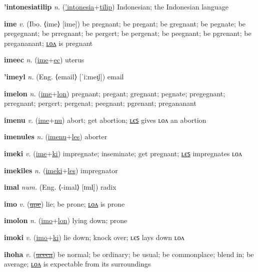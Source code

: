 \textbf{\hypertarget{'intonesiatilip}{'intonesiatilip}} \textit{n.} (\hyperlink{'intonesia}{'intonesia}+\allowbreak \hyperlink{tilip}{tilip})
Indonesian; the Indonesian language

\textbf{\hypertarget{ime}{ime}} \textit{v.} (Ibo. ⟨ime⟩ [ime])
be pregnant; be pregant; be gregnant; be pegnate; be pregegnant; be prregnant; be pergert; be pergenat; be peegnant; be pgrenant; be pregananant; \hyperlink{imelon}{ʟᴏᴧ} is pregnant

\textbf{\hypertarget{imeec}{imeec}} \textit{n.} (\hyperlink{ime}{ime}+\allowbreak \hyperlink{ec}{ec})
uterus

\textbf{\hypertarget{'imeyl}{'imeyl}} \textit{n.} (Eng. ⟨email⟩ [ˈiːmeɪ̯l])
email

\textbf{\hypertarget{imelon}{imelon}} \textit{n.} (\hyperlink{ime}{ime}+\allowbreak \hyperlink{lon}{lon})
pregnant; pregant; gregnant; pegnate; pregegnant; prregnant; pergert; pergenat; peegnant; pgrenant; pregananant

\textbf{\hypertarget{imenu}{imenu}} \textit{v.} (\hyperlink{ime}{ime}+\allowbreak \hyperlink{nu}{nu})
abort; get abortion; \hyperlink{imenules}{ʟєꜱ} gives ʟᴏᴧ an abortion

\textbf{\hypertarget{imenules}{imenules}} \textit{n.} (\hyperlink{imenu}{imenu}+\allowbreak \hyperlink{les}{les})
aborter

\textbf{\hypertarget{imeki}{imeki}} \textit{v.} (\hyperlink{ime}{ime}+\allowbreak \hyperlink{ki}{ki})
impregnate; inseminate; get pregnant; \hyperlink{imekiles}{ʟєꜱ} impregnates ʟᴏᴧ

\textbf{\hypertarget{imekiles}{imekiles}} \textit{n.} (\hyperlink{imeki}{imeki}+\allowbreak \hyperlink{les}{les})
impregnator

\textbf{\hypertarget{imal}{imal}} \textit{num.} (Eng. ⟨-imal⟩ [ɪml̩])
radix

\textbf{\hypertarget{imo}{imo}} \textit{v.} (\hyperlink{upe}{\sout{upe}})
lie; be prone; \hyperlink{imolon}{ʟᴏᴧ} is prone

\textbf{\hypertarget{imolon}{imolon}} \textit{n.} (\hyperlink{imo}{imo}+\allowbreak \hyperlink{lon}{lon})
lying down; prone

\textbf{\hypertarget{imoki}{imoki}} \textit{v.} (\hyperlink{imo}{imo}+\allowbreak \hyperlink{ki}{ki})
lie down; knock over; ʟєꜱ lays down ʟᴏᴧ

\textbf{\hypertarget{ihoha}{ihoha}} \textit{v.} (\hyperlink{uceca}{\sout{uceca}})
be normal; be ordinary; be usual; be commonplace; blend in; be average; \hyperlink{ihohalon}{ʟᴏᴧ} is expectable from its surroundings

